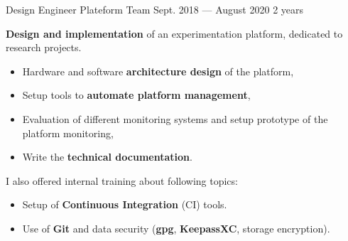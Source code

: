 \jobposition%
{Design Engineer}%
{Plateform Team}
{Sept. 2018 --- August 2020}%
{2 years}%
{
	\textbf{Design and implementation} of an experimentation platform, dedicated
	to research projects.
	\vspace{0.5em}
	\begin{itemize}
		\item Hardware and software \textbf{architecture design} of the
		      platform,
		\item Setup tools to \textbf{automate platform management},
		\item Evaluation of different monitoring systems and setup
		      prototype of the platform monitoring,
		\item Write the \textbf{technical documentation}.
	\end{itemize}
	\vspace{0.5em}
	I also offered internal training about following topics:
	\vspace{0.5em}
	\begin{itemize}
		\item Setup of \textbf{Continuous Integration} (CI) tools.
		\item Use of \textbf{Git} and data security (\textbf{gpg},
		      \textbf{KeepassXC}, storage encryption).
	\end{itemize}
	\vspace{1em}

}
